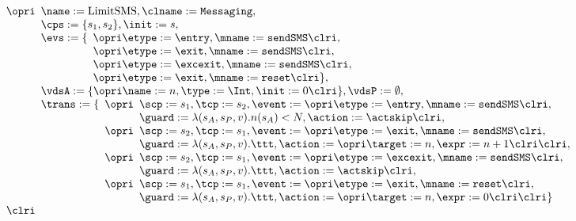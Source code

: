 \[
\begin{array}[t]{l}
\opri
\begin{array}[t]{l}
\name := \textrm{LimitSMS}, \clname := \texttt{Messaging},\\
\cps := \{s_1, s_2\},
\init := s,\\
\evs := \{
\begin{array}[t]{l}
\opri \etype := \entry, \mname := \texttt{sendSMS} \clri,\\
\opri \etype := \exit, \mname := \texttt{sendSMS} \clri,\\
\opri \etype := \excexit, \mname := \texttt{sendSMS} \clri,\\
\opri \etype := \exit, \mname := \texttt{reset} \clri\},
\end{array}
\\
\vdsA := \{\opri \name := n, \type := \Int, \init := 0 \clri\},
\vdsP := \emptyset,\\
\trans := \{
\begin{array}[t]{l}
\opri
 \begin{array}[t]{l}
\scp := s_1, \tcp := s_2,
             \event := \opri \etype := \entry,
                             \mname := \texttt{sendSMS} \clri, \\
             \guard := \lambda(s_A, s_P, v). n(s_A) < N,
             \action := \actskip
            \clri,
\end{array}\\
\opri
 \begin{array}[t]{l}
\scp := s_2, \tcp := s_1,
             \event := \opri \etype := \exit,
                             \mname := \texttt{sendSMS} \clri, \\
             \guard := \lambda(s_A, s_P, v). \ttt,
             \action := \opri \target := n, \expr := n + 1 \clri
            \clri,
\end{array}\\
\opri
 \begin{array}[t]{l}
\scp := s_2, \tcp := s_1,
             \event := \opri \etype := \excexit,
                             \mname := \texttt{sendSMS} \clri, \\
             \guard := \lambda(s_A, s_P, v). \ttt,
             \action := \actskip
            \clri,
\end{array}\\
\opri
\begin{array}[t]{l}
\scp := s_1, \tcp := s_1,
             \event := \opri \etype := \exit, \mname := \texttt{reset}
\clri, \\
             \guard := \lambda(s_A, s_P, v). \ttt,
             \action := \opri \target := n, \expr := 0 \clri
           \clri \}
\end{array}
\end{array}
\end{array}\\
\clri
\end{array}
\]

